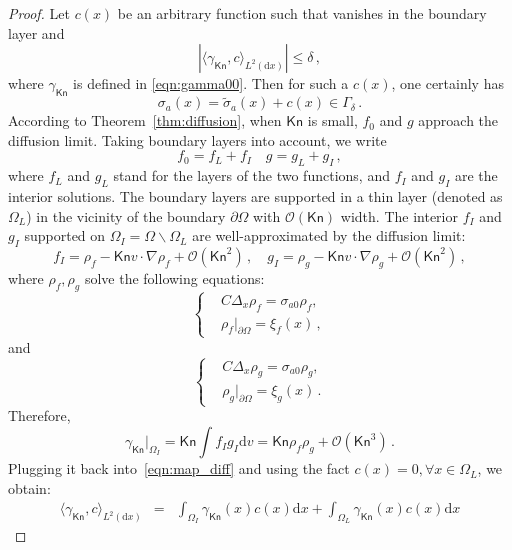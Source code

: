 \documentclass[english,reqno]{amsart}
\theoremstyle{plain}
\theoremstyle{definition} %
\newcommand{\rd}{\mathrm{d}}
\newcommand{\Kn}{\mathsf{Kn}}
\begin{document}
\begin{proof}
Let $c(x)$ be an arbitrary function such that vanishes in the boundary layer and 
\begin{equation}\label{eqn:map_diff}
|\langle \gamma_\Kn,c\rangle_{L^2(\rd{x})}|\leq \delta\,,
\end{equation}
where $\gamma_\Kn $ is defined in \eqref{eqn:gamma00}. Then for such a $c(x)$, one certainly has
\[
\sigma_a(x)=\tilde{\sigma}_a(x)+c(x)\in \Gamma_\delta\,.
\]
According to Theorem~\ref{thm:diffusion}, when $\Kn$ is small, $f_0$ and $g$ approach the diffusion limit. Taking boundary layers into account, we write
\begin{equation*}
f_0=f_L+f_I\quad g=g_L+g_I\,,
\end{equation*}
where $f_L$ and $g_L$ stand for the layers of the two functions, and $f_I$ and $g_I$ are the interior solutions. The boundary layers are supported in a thin layer (denoted as $\Omega_L$) in the vicinity of the boundary $\partial\Omega$ with $\mathcal{O}(\Kn)$ width. The interior $f_I$ and $g_I$ supported on $\Omega_I = \Omega \backslash \Omega_L$ are well-approximated by the diffusion limit:
\begin{equation*}
f_I=\rho_f - \Kn v \cdot \nabla \rho_f +\mathcal{O}(\Kn^2 )\,,\quad g_I=\rho_g- \Kn v \cdot \nabla \rho_g +\mathcal{O}(\Kn^2)\,,
\end{equation*}
where $\rho_f,\rho_g$ solve the following equations:
\begin{equation} \label{eqn:rho-f-0}
\begin{cases}
& C\Delta _x \rho_f  = \sigma_{a0} \rho_f, 
\\
&\rho_f |_{\partial \Omega} = \xi_f(x)\,,
\end{cases}
\end{equation}
and
\begin{equation} \label{eqn:g-0}
\begin{cases}
&C \Delta_x \rho_g  = \sigma_{a0} \rho_g, 
\\
&\rho_g |_{\partial \Omega} =\xi_g(x)\,.
\end{cases}
\end{equation}
Therefore,
\begin{equation*}
\gamma_\Kn |_{\Omega_I}= \Kn \int  f_I g_I\rd{v} = \Kn  \rho_f\rho_g + \mathcal{O}(\Kn^3)\,.
\end{equation*}
Plugging it back into~\eqref{eqn:map_diff} and using the fact $c(x)=0,\forall x\in \Omega_L$, we obtain:
\begin{eqnarray}
\langle \gamma_\Kn,c\rangle_{L^2(\rd{x})}&=&\int_{\Omega_I} \gamma_\Kn (x)c(x)\rd x+\int_{\Omega_L}\gamma_\Kn(x)c(x)\rd x \nonumber

\end{eqnarray}
\end{proof}
\end{document}
